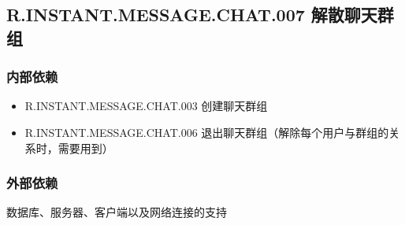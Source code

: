 \subsection{R.INSTANT.MESSAGE.CHAT.007 解散聊天群组}
\subsubsection{内部依赖}
\begin{itemize}
    \item R.INSTANT.MESSAGE.CHAT.003 创建聊天群组
    \item R.INSTANT.MESSAGE.CHAT.006 退出聊天群组（解除每个用户与群组的关系时，需要用到）
\end{itemize}
\subsubsection{外部依赖}
    数据库、服务器、客户端以及网络连接的支持
